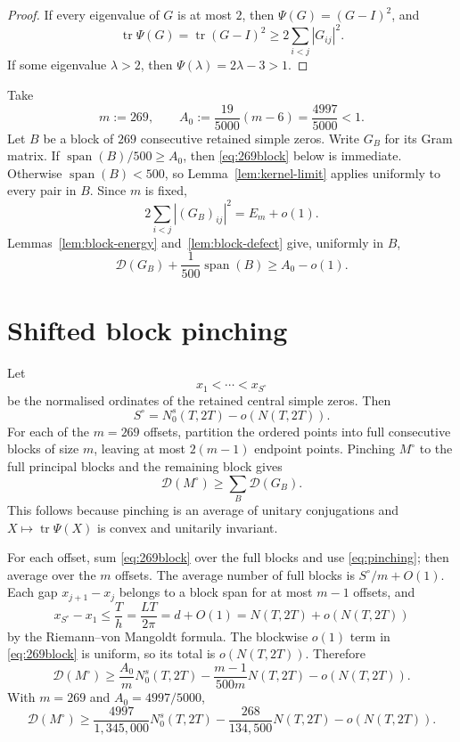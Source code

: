 \documentclass[11pt]{article}
\DeclareMathOperator{\tr}{tr}
\newcommand{\cD}{\mathcal D}
\begin{document}
\begin{proof}
If every eigenvalue of $G$ is at most $2$, then
$\Psi(G)=(G-I)^2$, and
\[
 \tr\Psi(G)=\tr(G-I)^2\ge2\sum_{i<j}|G_{ij}|^2.
\]
If some eigenvalue $\lambda>2$, then $\Psi(\lambda)=2\lambda-3>1$.
\end{proof}

Take
\begin{equation}\label{eq:mA}
 m:=269,
 \qquad
 A_0:=\frac{19}{5000}(m-6)=\frac{4997}{5000}<1.
\end{equation}
Let $B$ be a block of $269$ consecutive retained simple zeros.  Write $G_B$
for its Gram matrix.  If $\operatorname{span}(B)/500\ge A_0$, then
\eqref{eq:269block} below is immediate.  Otherwise
$\operatorname{span}(B)<500$, so Lemma~\ref{lem:kernel-limit} applies
uniformly to every pair in $B$.  Since $m$ is fixed,
\[
 2\sum_{i<j}|(G_B)_{ij}|^2=E_m+o(1).
\]
Lemmas~\ref{lem:block-energy} and~\ref{lem:block-defect} give, uniformly in
$B$,
\begin{equation}\label{eq:269block}
 \cD(G_B)+\frac1{500}\operatorname{span}(B)
 \ge A_0-o(1).
\end{equation}

\section{Shifted block pinching}

Let
\[
 x_1<\cdots<x_{S^\circ}
\]
be the normalised ordinates of the retained central simple zeros.  Then
\begin{equation}\label{eq:Scentral}
 S^\circ=N_0^s(T,2T)-o(N(T,2T)).
\end{equation}
For each of the $m=269$ offsets, partition the ordered points into full
consecutive blocks of size $m$, leaving at most $2(m-1)$ endpoint points.
Pinching $M^\circ$ to the full principal blocks and the remaining block gives
\begin{equation}\label{eq:pinching}
 \cD(M^\circ)\ge\sum_B\cD(G_B).
\end{equation}
This follows because pinching is an average of unitary conjugations and
$X\mapsto\tr\Psi(X)$ is convex and unitarily invariant.

For each offset, sum \eqref{eq:269block} over the full blocks and use
\eqref{eq:pinching}; then average over the $m$ offsets.  The average number of
full blocks is $S^\circ/m+O(1)$.  Each gap $x_{j+1}-x_j$ belongs to a block
span for at most $m-1$ offsets, and
\[
 x_{S^\circ}-x_1
 \le\frac{T}{h}
 =\frac{LT}{2\pi}
 =d+O(1)
 =N(T,2T)+o(N(T,2T))
\]
by the Riemann--von Mangoldt formula.  The blockwise $o(1)$ term in
\eqref{eq:269block} is uniform, so its total is $o(N(T,2T))$.  Therefore
\begin{equation}\label{eq:defect-global}
 \cD(M^\circ)
 \ge \frac{A_0}{m}N_0^s(T,2T)
 -\frac{m-1}{500m}N(T,2T)-o(N(T,2T)).
\end{equation}
With $m=269$ and $A_0=4997/5000$,
\begin{equation}\label{eq:defect-numbers}
 \cD(M^\circ)
 \ge
 \frac{4997}{1{,}345{,}000}N_0^s(T,2T)
 -\frac{268}{134{,}500}N(T,2T)-o(N(T,2T)).
\end{equation}
\end{document}
